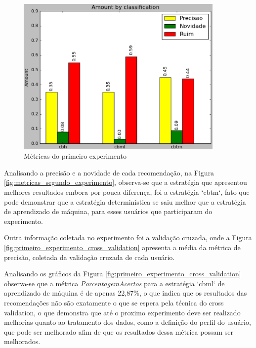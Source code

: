 \begin{figure}[h]
  \centering
  \includegraphics[width=0.9\textwidth]{figuras/metricas_primeiro_experimento.eps}
  \caption{Métricas do primeiro experimento}
  \label{fig:metricas_primeiro_experimento}
\end{figure}

Analisando a precisão e a novidade de cada recomendação, na Figura
\ref{fig:metricas_segundo_experimento}, observa-se que a estratégia que
apresentou melhores resultados embora por pouca diferença, foi a estratégia
`cbtm`, fato que pode demonstrar que a estratégia determinística se saiu melhor
que a estratégia de aprendizado de máquina, para esses usuários que
participaram do experimento.

Outra informação coletada no experimento foi a validação cruzada, onde a
Figura \ref{fig:primeiro_experimento_cross_validation} apresenta a média da
métrica de precisão, coletada da validação cruzada de cada usuário.

Analisando os gráficos da Figura \ref{fig:primeiro_experimento_cross_validation}
observa-se que a métrica \textit{PorcentagemAcertos} para a estratégia `cbml`
de aprendizado de máquina é de apenas 22,87\%, o que indica que os resultados
das recomendações não são exatamente o que se espera pela técnica do cross
validation, o que demonstra que até o proximo experimento deve ser realizado
melhorias quanto ao tratamento dos dados, como a definição do perfil do
usuário, que pode ser melhorado afim de que os resultados dessa métrica possam
ser melhorados.

\pagebreak


